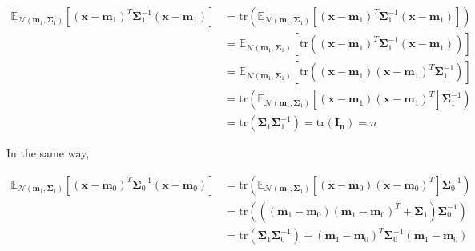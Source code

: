 \documentclass[a4paper]{article}
\begin{document}
\begin{enumerate}
    \begin{equation}
      \begin{aligned}
        \mathbb{E}_{\mathcal{N}\left(\boldsymbol{m}_{1}, \boldsymbol{\Sigma}_{1}\right)}\left[\left(\mathbf{x}-\boldsymbol{m}_{1}\right)^{T} \boldsymbol{\Sigma}_{1}^{-1}\left(\mathbf{x}-\boldsymbol{m}_{1}\right)\right] & = \text{tr}\left(\mathbb{E}_{\mathcal{N}\left(\boldsymbol{m}_{1}, \boldsymbol{\Sigma}_{1}\right)}\left[\left(\mathbf{x}-\boldsymbol{m}_{1}\right)^{T} \boldsymbol{\Sigma}_{1}^{-1}\left(\mathbf{x}-\boldsymbol{m}_{1}\right)\right]\right) \\
        & = \mathbb{E}_{\mathcal{N}\left(\boldsymbol{m}_{1}, \boldsymbol{\Sigma}_{1}\right)}\left[\text{tr}\left(\left(\mathbf{x}-\boldsymbol{m}_{1}\right)^{T} \boldsymbol{\Sigma}_{1}^{-1}\left(\mathbf{x}-\boldsymbol{m}_{1}\right)\right)\right] \\
        & = \mathbb{E}_{\mathcal{N}\left(\boldsymbol{m}_{1}, \boldsymbol{\Sigma}_{1}\right)}\left[\text{tr}\left(\left(\mathbf{x}-\boldsymbol{m}_{1}\right)\left(\mathbf{x}-\boldsymbol{m}_{1}\right)^{T} \boldsymbol{\Sigma}_{1}^{-1}\right)\right] \\
        & = \text{tr}\left(\mathbb{E}_{\mathcal{N}\left(\boldsymbol{m}_{1}, \boldsymbol{\Sigma}_{1}\right)}\left[\left(\mathbf{x}-\boldsymbol{m}_{1}\right)\left(\mathbf{x}-\boldsymbol{m}_{1}\right)^{T}\right] \boldsymbol{\Sigma}_{1}^{-1}\right) \\
        & = \text{tr}\left(\boldsymbol{\Sigma}_{1}\boldsymbol{\Sigma}_{1}^{-1}\right) = \text{tr}(\boldsymbol{I_n}) = n
      \end{aligned}
    \end{equation}

    In the same way, 

    \begin{equation}
      \begin{aligned}
        \mathbb{E}_{\mathcal{N}\left(\boldsymbol{m}_{1}, \boldsymbol{\Sigma}_{1}\right)}\left[\left(\mathbf{x}-\boldsymbol{m}_{0}\right)^{T} \boldsymbol{\Sigma}_{0}^{-1}\left(\mathbf{x}-\boldsymbol{m}_{0}\right)\right] & = \text{tr}\left(\mathbb{E}_{\mathcal{N}\left(\boldsymbol{m}_{1}, \boldsymbol{\Sigma}_{1}\right)}\left[\left(\mathbf{x}-\boldsymbol{m}_{0}\right)\left(\mathbf{x}-\boldsymbol{m}_{0}\right)^{T}\right] \boldsymbol{\Sigma}_{0}^{-1}\right) \\
        & = \text{tr}\left(\left(\left(\boldsymbol{m}_{1}-\boldsymbol{m}_{0}\right)\left(\boldsymbol{m}_{1}-\boldsymbol{m}_{0}\right)^{T}+\boldsymbol{\Sigma}_{1}\right)\boldsymbol{\Sigma}_{0}^{-1}\right) \\
        & = \text{tr}\left(\boldsymbol{\Sigma}_{1}\boldsymbol{\Sigma}_{0}^{-1}\right) + \left(\boldsymbol{m}_{1}-\boldsymbol{m}_{0}\right)^{T}\boldsymbol{\Sigma}_{0}^{-1}\left(\boldsymbol{m}_{1}-\boldsymbol{m}_{0}\right) 
      \end{aligned}
    \end{equation}



\end{enumerate}
\end{document}
